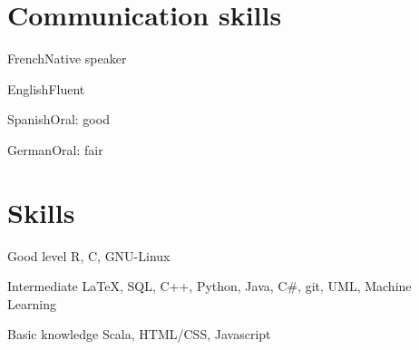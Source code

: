 \documentclass{tccv}
\begin{document}
\section{Communication skills}

\begin{factlist}
\item{French}{Native speaker}
\item{English}{Fluent}
\item{Spanish}{Oral: good}
\item{German}{Oral: fair}
\end{factlist}

\section{Skills}

\begin{factlist}

\item{Good level}
     {R, C, GNU-Linux}
     
\item{Intermediate}
     {\LaTeX, SQL, C++, Python, Java, C\#, git, UML, Machine Learning}
     
\item{Basic knowledge}
     {Scala, HTML/CSS, Javascript}

\end{factlist}
\end{document}
